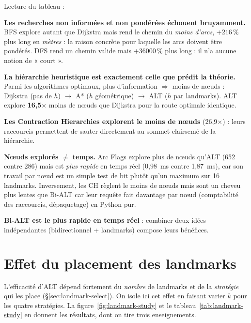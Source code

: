 \noindent Lecture du tableau :

\begin{bulletlist}
  \item \textbf{Les recherches non informées et non pondérées échouent
        bruyamment.} BFS explore autant que Dijkstra mais rend le chemin du
        \emph{moins d'arcs}, $+216\,\%$ plus long en \emph{mètres} : la raison
        concrète pour laquelle les arcs doivent être pondérés. DFS rend un chemin
        valide mais $+36000\,\%$ plus long : il n'a aucune notion de « court ».
  \item \textbf{La hiérarchie heuristique est exactement celle que prédit la
        théorie.} Parmi les algorithmes optimaux, plus d'information $\Rightarrow$
        moins de nœuds : Dijkstra (pas de $h$) $\to$ A* ($h$ géométrique) $\to$
        ALT ($h$ par landmarks). ALT explore \textbf{16{,}5$\times$} moins de
        nœuds que Dijkstra pour la route optimale identique.
  \item \textbf{Les Contraction Hierarchies explorent le moins de nœuds}
        (26{,}9$\times$) : leurs raccourcis permettent de sauter directement au
        sommet clairsemé de la hiérarchie.
  \item \textbf{Nœuds explorés $\neq$ temps.} Arc Flags explore plus de nœuds
        qu'ALT (652 contre 286) mais est \emph{plus rapide} en temps réel
        (0{,}98~ms contre 1{,}87~ms), car son travail par nœud est un simple test
        de bit plutôt qu'un maximum sur 16 landmarks. Inversement, les CH règlent
        le moins de nœuds mais sont un cheveu plus lentes que Bi-ALT car leur
        requête fait davantage par nœud (comptabilité des raccourcis,
        dépaquetage) en Python pur.
  \item \textbf{Bi-ALT est le plus rapide en temps réel} : combiner deux idées
        indépendantes (bidirectionnel + landmarks) compose leurs bénéfices.
\end{bulletlist}

\section{Effet du placement des landmarks}
\label{sec:landmark-study}

L'efficacité d'ALT dépend fortement du \emph{nombre} de landmarks et de la
\emph{stratégie} qui les place (\S\ref{sec:landmark-select}). On isole ici cet
effet en faisant varier $k$ pour les quatre stratégies. La
figure~\ref{fig:landmark-study} et le tableau~\ref{tab:landmark-study} en donnent
les résultats, dont on tire trois enseignements.

